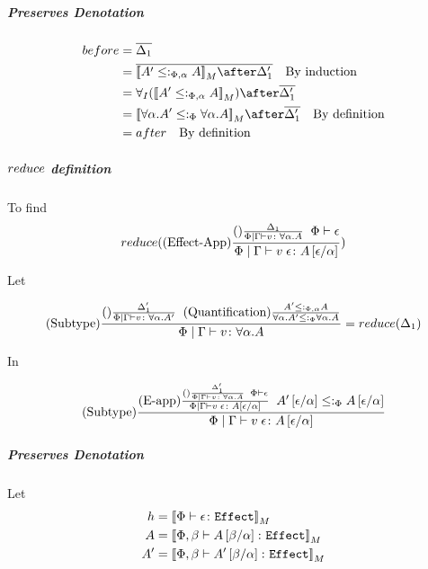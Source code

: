 \documentclass{report}
\begin{document}
        \subparagraph{Preserves Denotation}

        \begin{align}
            before &= \bar{\D_1}\\
            & = \bar{\deno{A'\subtypepa A}\after \D_1'}\qt{By induction}\\
            & = \allI(\deno{A'\subtypepa A})\after\bar{\D_1'}\\
            &= \deno{\all{\a}{A'}\subtypep\all{\a}{A}}\after\bar{\D_1'}\qt{By definition}\\
            & = after\qt{By definition}     
        \end{align}

        \subparagraph{$reduce$ definition}

        
        To find 
        \begin{equation}
            reduce((\text{Effect-App}) \frac{(\text{}) \frac{\Delta_1}{\Phi\mid\Gamma \vdash v \colon \forall \alpha. A}\;\;\Phi\vdash \epsilon}{\Phi\mid\Gamma \vdash v\;\epsilon \colon A\left[\epsilon / \alpha\right]})
        \end{equation}

        Let

        \begin{eqnarray}
            (\text{Subtype}) \frac{
                (\text{}) \frac{\Delta_1'}{\Phi\mid\Gamma \vdash v \colon \forall \alpha. A'}
                \;\; 
                (\text{Quantification}) \frac{A'\leq:_{\Phi, \alpha} A}{\forall \alpha. A'\leq:_\Phi\forall \alpha. A}
            }{
                \Phi\mid\Gamma \vdash v \colon \forall \alpha. A
            }= reduce(\Delta_1)
        \end{eqnarray}

        In

        \begin{equation}
            (\text{Subtype}) \frac{
                (\text{E-app}) \frac{
                    (\text{}) \frac{\Delta_1'}{\Phi\mid\Gamma \vdash v \colon \forall \alpha. A}\;\;\Phi\vdash \epsilon
                }{\Phi\mid\Gamma \vdash v\;\epsilon \colon A\left[\epsilon / \alpha\right]}
            \;\;
            A'\left[\epsilon / \alpha\right]\leq:_\Phi A\left[\epsilon / \alpha\right]
            }{
                \Phi\mid\Gamma \vdash v\;\epsilon \colon A\left[\epsilon / \alpha\right]
            }
        \end{equation}

        \subparagraph{Preserves Denotation}
        Let
        \begin{align}
            h &= {\bf [\![}\Phi \vdash \epsilon \colon \texttt{Effect}{\bf ]\!]}_M\\
            A & = {\bf [\![}\Phi,\beta \vdash A\left[\beta / \alpha\right] \colon \texttt{Effect}{\bf ]\!]}_M\\
            A' & = {\bf [\![}\Phi,\beta \vdash A'\left[\beta / \alpha\right] \colon \texttt{Effect}{\bf ]\!]}_M
        \end{align}
\end{document}
